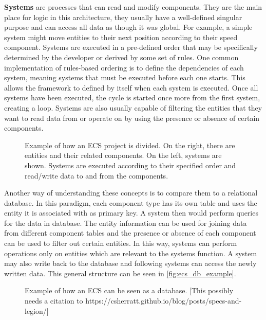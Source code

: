 \documentclass[twoside, 11pt]{article}
\begin{document}
\textbf{Systems} are processes that can read and modify components. They are the main place for logic in this architecture, they usually have a well-defined singular purpose and can access all data as though it was global. For example, a simple system might move entities to their next position according to their speed component. Systems are executed in a pre-defined order that may be specifically determined by the developer or derived by some set of rules. One common implementation of rules-based ordering is to define the dependencies of each system, meaning systems that must be executed before each one starts. This allows the framework to defined by itself when each system is executed. Once all systems have been executed, the cycle is started once more from the first system, creating a loop. Systems are also usually capable of filtering the entities that they want to read data from or operate on by using the presence or absence of certain components.

\begin{figure}
  \centering
  
  \caption{Example of how an ECS project is divided. On the right, there are entities and their related components. On the left, systems are shown. Systems are executed according to their specified order and read/write data to and from the components.}
  \label{fig:ecs_basic_example}
\end{figure}

Another way of understanding these concepts is to compare them to a relational database. In this paradigm, each component type has its own table and uses the entity it is associated with as primary key. A system then would perform queries for the data in database. The entity information can be used for joining data from different component tables and the presence or absence of each component can be used to filter out certain entities. In this way, systems can perform operations only on entities which are relevant to the systems function. A system may also write back to the database and following systems can access the newly written data. This general structure can be seen in \autoref{fig:ecs_db_example}.

\begin{figure}
  \centering
  
  \caption{Example of how an ECS can be seen as a database. [This possibly needs a citation to https://csherratt.github.io/blog/posts/specs-and-legion/]}
  \label{fig:ecs_db_example}
\end{figure}
\end{document}
